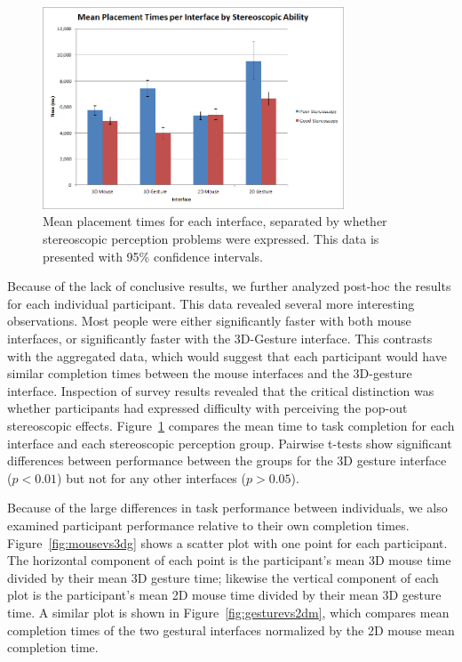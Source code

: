 \documentclass[pageno]{jpaper}
\begin{document}
\begin{figure}
\centering
\includegraphics[width=0.8\textwidth]{figures/mean.png}
\caption{Mean placement times for each interface, separated by whether
stereoscopic perception problems were expressed. This data is presented with 95\% confidence intervals.}
\label{fig:sepmean}
\end{figure}
Because of the lack of conclusive results, we further analyzed post-hoc the results for each individual participant. This data revealed several more interesting observations.
Most people were either significantly faster with both mouse interfaces, or significantly faster with the 3D-Gesture interface.
This contrasts with the aggregated data, which would suggest that each participant would have similar completion times between the mouse interfaces and the 3D-gesture
interface. Inspection of survey results revealed that the critical distinction
was whether participants had expressed difficulty with perceiving
the pop-out stereoscopic effects. Figure~\ref{fig:sepmean} compares the mean
time to task completion for each interface and each stereoscopic perception
group. Pairwise t-tests show significant differences between performance between
the groups for the 3D gesture interface ($p < 0.01$) but not for any other
interfaces ($p > 0.05$).

Because of the large differences in task performance between individuals, we
also examined participant performance relative to their own completion times.
Figure~\ref{fig:mousevs3dg} shows a scatter plot with one point for each
participant. The horizontal component of each point is the participant's mean 3D
mouse time divided by their mean 3D gesture time; likewise the vertical
component of each plot is the participant's mean 2D mouse time divided by their
mean 3D gesture time. A similar plot is shown in Figure~\ref{fig:gesturevs2dm},
which compares mean completion times of the two gestural interfaces normalized
by the 2D mouse mean completion time.
\end{document}
